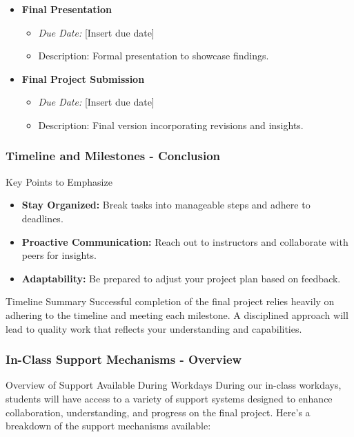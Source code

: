 \documentclass[aspectratio=169]{beamer}
\begin{document}
\begin{frame}[fragile]
\begin{itemize}
        \item \textbf{Final Presentation}
            \begin{itemize}
                \item \textit{Due Date:} [Insert due date]
                \item Description: Formal presentation to showcase findings.
            \end{itemize}

        \item \textbf{Final Project Submission}
            \begin{itemize}
                \item \textit{Due Date:} [Insert due date]
                \item Description: Final version incorporating revisions and insights.
            \end{itemize}
    \end{itemize}
\end{frame}

\begin{frame}[fragile]
    \frametitle{Timeline and Milestones - Conclusion}
    \begin{block}{Key Points to Emphasize}
        \begin{itemize}
            \item \textbf{Stay Organized:} Break tasks into manageable steps and adhere to deadlines.
            \item \textbf{Proactive Communication:} Reach out to instructors and collaborate with peers for insights.
            \item \textbf{Adaptability:} Be prepared to adjust your project plan based on feedback.
        \end{itemize}
    \end{block}
    
    \begin{block}{Timeline Summary}
        Successful completion of the final project relies heavily on adhering to the timeline and meeting each milestone. A disciplined approach will lead to quality work that reflects your understanding and capabilities.
    \end{block}
\end{frame}

\begin{frame}[fragile]
    \frametitle{In-Class Support Mechanisms - Overview}
    \begin{block}{Overview of Support Available During Workdays}
        During our in-class workdays, students will have access to a variety of support systems designed to enhance collaboration, understanding, and progress on the final project. Here’s a breakdown of the support mechanisms available:
    \end{block}
\end{frame}
\end{document}
